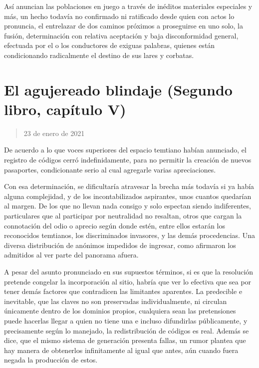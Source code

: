 \documentclass[
]{book}
\begin{document}
Así anuncian las poblaciones en juego a través de inéditos materiales especiales y más, un hecho todavía no confirmado ni ratificado desde quien con actos lo pronuncia, el entrelazar de dos caminos próximos a proseguirse en uno solo, la fusión, determinación con relativa aceptación y baja disconformidad general, efectuada por el o los conductores de exiguas palabras, quienes están condicionando radicalmente el destino de sus lares y corbatas.

\hypertarget{el-agujereado-blindaje-segundo-libro-capuxedtulo-v}{%
\section{El agujereado blindaje (Segundo libro, capítulo V)}\label{el-agujereado-blindaje-segundo-libro-capuxedtulo-v}}

\begin{quote}
23 de enero de 2021
\end{quote}

De acuerdo a lo que voces superiores del espacio temtiano habían anunciado, el registro de códigos cerró indefinidamente, para no permitir la creación de nuevos pasaportes, condicionante serio al cual agregarle varias apreciaciones.

Con esa determinación, se dificultaría atravesar la brecha más todavía si ya había alguna complejidad, y de los incontabilizados aspirantes, unos cuantos quedarían al margen. De los que no llevan nada consigo y solo espectan siendo indiferentes, particulares que al participar por neutralidad no resaltan, otros que cargan la connotación del odio o aprecio según donde estén, entre ellos estarán los reconocidos temtianos, los discriminados invasores, y las demás procedencias. Una diversa distribución de anónimos impedidos de ingresar, como afirmaron los admitidos al ver parte del panorama afuera.

A pesar del asunto pronunciado en sus supuestos términos, si es que la resolución pretende congelar la incorporación al sitio, habría que ver lo efectiva que sea por tener demás factores que contradicen las limitantes aparentes. La predecible e inevitable, que las claves no son preservadas individualmente, ni circulan únicamente dentro de los dominios propios, cualquiera sean las pretensiones puede hacerlas llegar a quien no tiene una e incluso difundirlas públicamente, y precisamente según lo manejado, la redistribución de códigos es real. Además se dice, que el mismo sistema de generación presenta fallas, un rumor plantea que hay manera de obtenerlos infinitamente al igual que antes, aún cuando fuera negada la producción de estos.
\end{document}
